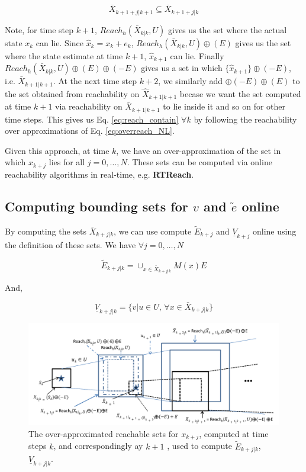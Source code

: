 \begin{equation}
\label{eq:reach_contain}
\bar{X}_{k+1+j|k+1} \subseteq \bar{X}_{k+1+j|k}
\end{equation}

Note, for time step $k+1$, $Reach_h(\bar{X}_{k|k},U)$ gives us the set where the actual state $x_k$ can lie. Since $\hat{x}_k = x_k+e_k$, $Reach_h(\bar{X}_{k|k},U) \oplus (E)$ gives us the set where the state estimate at time $k+1$, $\hat{x}_{k+1}$ can lie. Finally $Reach_h(\bar{X}_{k|k},U) \oplus (E) \oplus (-E)$ gives us a set in which $\lbrace \hat{x}_{k+1} \rbrace \oplus (-E)$, i.e. $\bar{X}_{k+1|k+1}$. At the next time step $k+2$, we similarly add $\oplus (-E)\oplus (E)$ to the set obtained from reachability on $\hat{X}_{k+1|k+1}$ becase we want the set computed at time $k+1$ via reachability on $\bar{X}_{k+1|k+1}$ to lie inside it and so on for other time steps. This gives us Eq. \ref{eq:reach_contain} $\forall k$ by following the reachability over approximations of Eq. \ref{eq:overreach_NL}.

Given this approach, at time $k$, we have an over-approximation of the set in which $x_{k+j}$ lies for all $j=0,\dotsc,N$. These sets can be computed via online reachability algorithms in real-time, e.g. \textbf{RTReach}.

\subsection{Computing bounding sets for $v$ and $\tilde{e}$ online}

By computing the sets $\bar{X}_{k+j|k}$, we can use compute $\tilde{E}_{k+j}$ and $\underline{V}_{k+j}$ online using the definition of these sets. We have $\forall j=0,\dotsc,N$

\begin{equation}
\tilde{E}_{k+j|k}  = \cup_{x \in \bar{X}_{k+j|k}}M(x)E
\end{equation}

And, 

\begin{equation}
\underline{V}_{k+j|k} = \lbrace v|u\in U, \, \forall x \in \bar{X}_{k+j|k} \rbrace
\end{equation}



\begin{figure}
\includegraphics[scale=0.75]{figs/OverReachFigure_NL_scissored.pdf}
\caption{The over-approximated reachable sets for $x_{k+j}$, computed at time steps $k$, and correspondingly ay $k+1$ , used to compute $\tilde{E}_{k+j|k}$, $\underline{V}_{k+j|k}$. }
\label{fig:overreach_NL}
\end{figure}